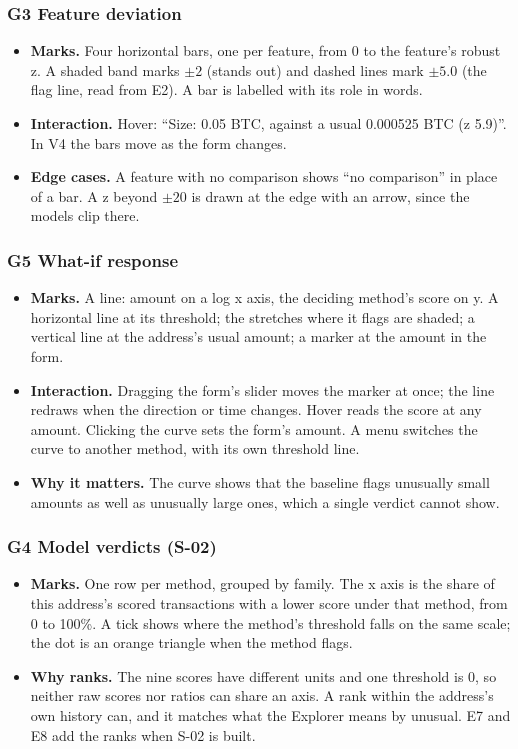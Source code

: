 \subsubsection*{G3 \quad Feature deviation}
\begin{itemize}
  \item \textbf{Marks.} Four horizontal bars, one per feature, from 0 to the feature's robust z.
    A shaded band marks $\pm 2$ (stands out) and dashed lines mark $\pm 5.0$ (the flag line, read
    from E2). A bar is labelled with its role in words.
  \item \textbf{Interaction.} Hover: ``Size: 0.05 BTC, against a usual 0.000525 BTC (z 5.9)''.
    In V4 the bars move as the form changes.
  \item \textbf{Edge cases.} A feature with no comparison shows ``no comparison'' in place of a
    bar. A z beyond $\pm 20$ is drawn at the edge with an arrow, since the models clip there.
\end{itemize}

\subsubsection*{G5 \quad What-if response}
\begin{itemize}
  \item \textbf{Marks.} A line: amount on a log x axis, the deciding method's score on y. A
    horizontal line at its threshold; the stretches where it flags are shaded; a vertical line at
    the address's usual amount; a marker at the amount in the form.
  \item \textbf{Interaction.} Dragging the form's slider moves the marker at once; the line
    redraws when the direction or time changes. Hover reads the score at any amount. Clicking the
    curve sets the form's amount. A menu switches the curve to another method, with its own
    threshold line.
  \item \textbf{Why it matters.} The curve shows that the baseline flags unusually small amounts
    as well as unusually large ones, which a single verdict cannot show.
\end{itemize}

\subsubsection*{G4 \quad Model verdicts (S-02)}
\begin{itemize}
  \item \textbf{Marks.} One row per method, grouped by family. The x axis is the share of this
    address's scored transactions with a lower score under that method, from 0 to 100\%. A tick
    shows where the method's threshold falls on the same scale; the dot is an orange triangle when
    the method flags.
  \item \textbf{Why ranks.} The nine scores have different units and one threshold is 0, so
    neither raw scores nor ratios can share an axis. A rank within the address's own history can,
    and it matches what the Explorer means by unusual. E7 and E8 add the ranks when S-02 is built.
\end{itemize}

